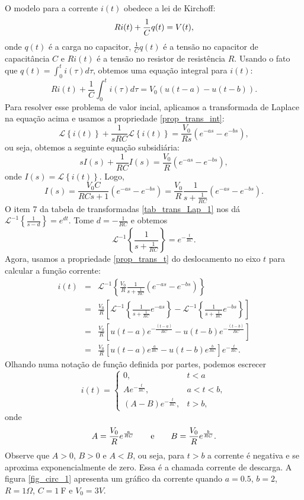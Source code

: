 \documentclass[Main.tex]{subfiles}
\begin{document}
O modelo para a corrente $i(t)$ obedece a lei de Kirchoff:
\begin{equation}{\label{modelo_corrente_0}}
 Ri(t)+\frac{1}{C}q(t)=V(t),
\end{equation}
onde $q(t)$ é a carga no capacitor, $\frac{1}{C}q(t)$ é a tensão no capacitor de capacitância $C$ e $Ri(t)$ é a tensão no resistor de resistência $R$. Usando o fato que $q(t)=\int_0^t i(\tau)d\tau$, obtemos uma equação integral para $i(t)$:
$$
Ri(t)+\frac{1}{C}\int_0^t i(\tau)d\tau=V_0\left(u(t-a)-u(t-b)\right).
$$
Para resolver esse problema de valor incial, aplicamos a transformada de Laplace na equação acima e usamos a propriedade \ref{prop_trans_int}:
$$
\mathcal{L}\left\{i(t)\right\}+\frac{1}{sRC}\mathcal{L}\left\{i(t)\right\}=\frac{V_0}{Rs}\left(e^{-as}-e^{-bs}\right),
$$
ou seja, obtemos a seguinte equação subsidiária:
$$
sI(s)+\frac{1}{RC}I(s)=\frac{V_0}{R}\left(e^{-as}-e^{-bs}\right),
$$
onde $I(s)=\mathcal{L}\left\{i(t)\right\}$. Logo,
$$
I(s)=\frac{V_0 C}{RCs+1}\left(e^{-as}-e^{-bs}\right)=\frac{V_0}{R}\frac{1}{s+\frac{1}{RC}}\left(e^{-as}-e^{-bs}\right).
$$
O item 7 da tabela de transformadas \ref{tab_trans_Lap_1} nos dá $\mathcal{L}^{-1}\left\{\frac{1}{s-d}\right\}=e^{dt}$. Tome $d=-\frac{1}{RC}$ e obtemos
$$
\mathcal{L}^{-1}\left\{\frac{1}{s+\frac{1}{RC}}\right\}=e^{-\frac{t}{RC}}.
$$
Agora, usamos a propriedade \ref{prop_trans_t} do deslocamento no eixo $t$ para calcular a função corrente:
\begin{eqnarray*}
i(t)&=&\mathcal{L}^{-1}\left\{\frac{V_0}{R}\frac{1}{s+\frac{1}{RC}}\left(e^{-as}-e^{-bs}\right)\right\}\\
&=&\frac{V_0}{R}\left[\mathcal{L}^{-1}\left\{\frac{1}{s+\frac{1}{RC}}e^{-as}\right\}-\mathcal{L}^{-1}\left\{\frac{1}{s+\frac{1}{RC}}e^{-bs}\right\}\right]\\
&=&\frac{V_0}{R}\left[u(t-a)e^{-\frac{(t-a)}{RC}}-u(t-b)e^{-\frac{(t-b)}{RC}}\right]\\
&=&\frac{V_0}{R}\left[u(t-a)e^{\frac{a}{RC}}-u(t-b)e^{\frac{b}{RC}}\right]e^{-\frac{t}{RC}}.
\end{eqnarray*}
Olhando numa notação de função definida por partes, podemos escrecer
$$
i(t)=\left\{\begin{array}{ll}0,&t<a  \\A e^{-\frac{t}{RC}}, &a<t<b, \\ \left(A-B\right)e^{-\frac{t}{RC}}, &t>b, \end{array}\right.
$$
onde
$$
A=\frac{V_0}{R}e^{\frac{a}{RC}}\qquad\hbox{e}\qquad B=\frac{V_0}{R}e^{\frac{b}{RC}}.
$$
Observe que $A>0$, $B>0$ e $A<B$, ou seja, para $t>b$ a corrente é negativa e se aproxima exponencialmente de zero. Essa é a chamada corrente de descarga. A figura \ref{fig_circ_1} apresenta um gráfico da corrente quando $a=0.5$, $b=2$, $R=1\Omega$, $C=1\ \!$F e $V_0=3V$.
\end{document}
